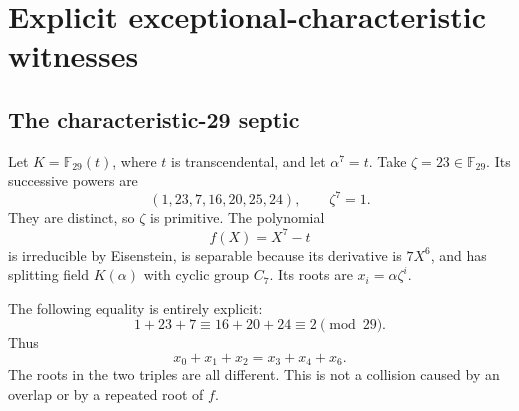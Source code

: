 \documentclass[11pt,a4paper]{article}
\theoremstyle{definition}
\theoremstyle{remark}
\newcommand{\F}{\mathbb F}
\begin{document}
\section{Explicit exceptional-characteristic witnesses}
\label{sec:witnesses}

\subsection{The characteristic-29 septic}

Let $K=\F_{29}(t)$, where $t$ is transcendental, and let $\alpha^7=t$.
Take $\zeta=23\in\F_{29}$. Its successive powers are
\[
 (1,23,7,16,20,25,24),\qquad \zeta^7=1.
\]
They are distinct, so $\zeta$ is primitive. The polynomial
\[
 f(X)=X^7-t
\]
is irreducible by Eisenstein, is separable because its derivative is
$7X^6$, and has splitting field $K(\alpha)$ with cyclic group $C_7$.
Its roots are $x_i=\alpha\zeta^i$.

The following equality is entirely explicit:
\[
 1+23+7\equiv16+20+24\equiv2\pmod{29}.
\]
Thus
\begin{equation}
 x_0+x_1+x_2=x_3+x_4+x_6.
 \label{eq:collision29}
\end{equation}
The roots in the two triples are all different. This is not a collision
caused by an overlap or by a repeated root of $f$.
\end{document}

